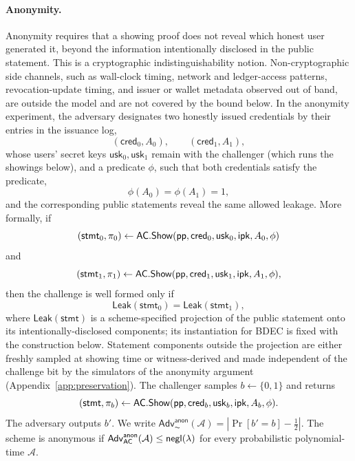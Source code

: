 \paragraph{Anonymity.}
Anonymity requires that a showing proof does not reveal which honest user generated it, beyond the information intentionally disclosed in the public statement. This is a cryptographic indistinguishability notion. Non-cryptographic side channels, such as wall-clock timing, network and ledger-access patterns, revocation-update timing, and issuer or wallet metadata observed out of band, are outside the model and are not covered by the bound below. In the anonymity experiment, the adversary designates two honestly issued credentials by their entries in the issuance log,
\begin{equation*}
  (\mathsf{cred}_0,A_0),
  \qquad
  (\mathsf{cred}_1,A_1),
\end{equation*}
whose users' secret keys \(\mathsf{usk}_0,\mathsf{usk}_1\) remain with the challenger (which runs the showings below), and a predicate \(\phi\), such that both credentials satisfy the predicate,
\begin{equation*}
  \phi(A_0)=\phi(A_1)=1,
\end{equation*}
and the corresponding public statements reveal the same allowed leakage. More formally, if
\begin{equation*}
  (\mathsf{stmt}_0,\pi_0)
  \leftarrow
  \mathsf{AC}.\mathsf{Show}(\mathsf{pp},\mathsf{cred}_0,\mathsf{usk}_0,\mathsf{ipk},A_0,\phi)
\end{equation*}
and
\begin{equation*}
  (\mathsf{stmt}_1,\pi_1)
  \leftarrow
  \mathsf{AC}.\mathsf{Show}(\mathsf{pp},\mathsf{cred}_1,\mathsf{usk}_1,\mathsf{ipk},A_1,\phi),
\end{equation*}
then the challenge is well formed only if
\begin{equation*}
  \mathsf{Leak}(\mathsf{stmt}_0)=\mathsf{Leak}(\mathsf{stmt}_1),
\end{equation*}
where \(\mathsf{Leak}(\mathsf{stmt})\) is a scheme-specified projection of the public statement onto its intentionally-disclosed components; its instantiation for BDEC is fixed with the construction below. Statement components outside the projection are either freshly sampled at showing time or witness-derived and made independent of the challenge bit by the simulators of the anonymity argument (Appendix~\ref{app:preservation}). The challenger samples \(b\leftarrow\{0,1\}\) and returns
\begin{equation*}
  (\mathsf{stmt},\pi_b)
  \leftarrow
  \mathsf{AC}.\mathsf{Show}(\mathsf{pp},\mathsf{cred}_b,\mathsf{usk}_b,\mathsf{ipk},A_b,\phi).
\end{equation*}
The adversary outputs \(b'\). We write \(\mathsf{Adv}^{\mathsf{anon}}_{\AC}(\mathcal A)=\left|\Pr[b'=b]-\tfrac12\right|\). The scheme is anonymous if \(\mathsf{Adv}^{\mathsf{anon}}_{\mathsf{AC}}(\mathcal A)\le\mathsf{negl}(\lambda)\) for every probabilistic polynomial-time \(\mathcal A\).

